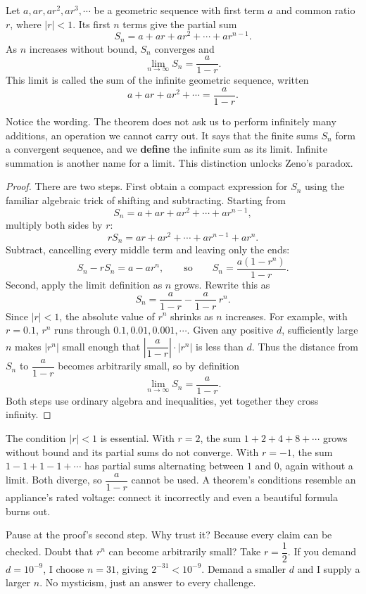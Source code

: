 \begin{dingli}\label{ch9:geo}
Let $a,ar,ar^2,ar^3,\cdots$ be a geometric sequence with first term $a$ and common ratio $r$, where $|r|<1$. Its first $n$ terms give the partial sum
\[
S_n=a+ar+ar^2+\cdots+ar^{n-1}.
\]
As $n$ increases without bound, $S_n$ converges and
\[
\lim_{n\to\infty}S_n=\frac{a}{1-r}.
\]
This limit is called the sum of the infinite geometric sequence, written
\[
a+ar+ar^2+\cdots=\frac{a}{1-r}.
\]
\end{dingli}

Notice the wording. The theorem does not ask us to perform infinitely many additions, an operation we cannot carry out. It says that the finite sums $S_n$ form a convergent sequence, and we \textbf{define} the infinite sum as its limit. Infinite summation is another name for a limit. This distinction unlocks Zeno's paradox.

\begin{proof}
There are two steps. First obtain a compact expression for $S_n$ using the familiar algebraic trick of shifting and subtracting. Starting from
\[
S_n=a+ar+ar^2+\cdots+ar^{n-1},
\]
multiply both sides by $r$:
\[
rS_n=ar+ar^2+\cdots+ar^{n-1}+ar^{n}.
\]
Subtract, cancelling every middle term and leaving only the ends:
\[
S_n-rS_n=a-ar^n,
\qquad\text{so}\qquad
S_n=\frac{a(1-r^n)}{1-r}.
\]
Second, apply the limit definition as $n$ grows. Rewrite this as
\[
S_n=\frac{a}{1-r}-\frac{a}{1-r}\,r^n.
\]
Since $|r|<1$, the absolute value of $r^n$ shrinks as $n$ increases. For example, with $r=0.1$, $r^n$ runs through $0.1,0.01,0.001,\cdots$. Given any positive $d$, sufficiently large $n$ makes $|r^n|$ small enough that $\left|\dfrac{a}{1-r}\right|\cdot|r^n|$ is less than $d$. Thus the distance from $S_n$ to $\dfrac{a}{1-r}$ becomes arbitrarily small, so by definition
\[
\lim_{n\to\infty}S_n=\frac{a}{1-r}.
\]
Both steps use ordinary algebra and inequalities, yet together they cross infinity.
\end{proof}

The condition $|r|<1$ is essential. With $r=2$, the sum $1+2+4+8+\cdots$ grows without bound and its partial sums do not converge. With $r=-1$, the sum $1-1+1-1+\cdots$ has partial sums alternating between $1$ and $0$, again without a limit. Both diverge, so $\dfrac{a}{1-r}$ cannot be used. A theorem's conditions resemble an appliance's rated voltage: connect it incorrectly and even a beautiful formula burns out.

Pause at the proof's second step. Why trust it? Because every claim can be checked. Doubt that $r^n$ can become arbitrarily small? Take $r=\dfrac{1}{2}$. If you demand $d=10^{-9}$, I choose $n=31$, giving $2^{-31}<10^{-9}$. Demand a smaller $d$ and I supply a larger $n$. No mysticism, just an answer to every challenge.

